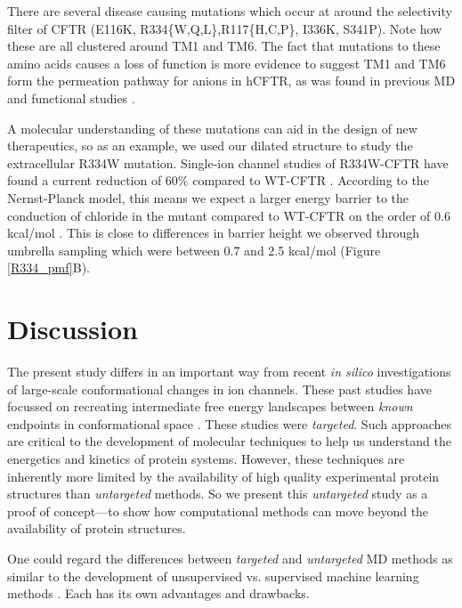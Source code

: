 There are several disease causing mutations which occur at around the selectivity filter of CFTR (E116K, R334\{W,Q,L\},R117\{H,C,P\}, I336K, S341P)\cite{cftr2}. Note how these are all clustered around TM1 and TM6. The fact that mutations to these amino acids causes a loss of function is more evidence to suggest TM1 and TM6 form the permeation pathway for anions in hCFTR, as was found in previous MD and functional studies \cite{zeng2021,farkas2020, linsdell2016, linsdell2018}. 

A molecular understanding of these mutations can aid in the design of new therapeutics, so as an example, we used our dilated structure to study the extracellular R334W mutation. Single-ion channel studies of R334W-CFTR have found a current reduction of 60\% compared to WT-CFTR \cite{gong2004}. According to the Nernst-Planck model, this means we expect a larger energy barrier to the conduction of chloride in the mutant compared to WT-CFTR on the order of 0.6 kcal/mol \cite{kuyucak2001}. This is close to differences in barrier height we observed through umbrella sampling which were between 0.7 and 2.5 kcal/mol (Figure \ref{R334_pmf}B). 

\section{Discussion}

The present study differs in an important way from recent \textit{in silico} investigations of large-scale conformational changes in ion channels. These past studies have focussed on recreating intermediate free energy landscapes between \textit{known} endpoints in conformational space \cite{lev2020, bergh2021, moradi2015}. These studies were \textit{targeted}. Such approaches are critical to the development of molecular techniques to help us understand the energetics and kinetics of protein systems. However, these techniques are inherently more limited by the availability of high quality experimental protein structures than \textit{untargeted} methods. So we present this \textit{untargeted} study as a proof of concept---to show how computational methods can move beyond the availability of protein structures.

One could regard the differences between \textit{targeted} and \textit{untargeted} MD methods as similar to the development of unsupervised vs. supervised machine learning methods \cite{grus2015, friedman2017}. Each has its own advantages and drawbacks.



